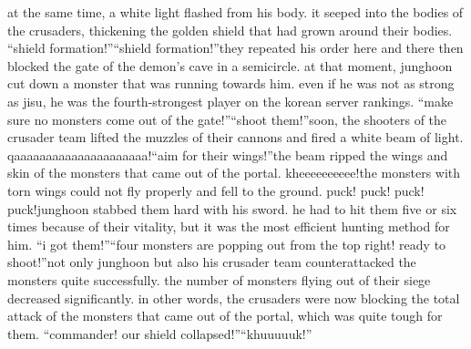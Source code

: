 at the same time, a white light flashed from his body.
 it seeped into the bodies of the crusaders, thickening the golden shield that had grown around their bodies.
“shield formation!”“shield formation!”they repeated his order here and there then blocked the gate of the demon’s cave in a semicircle.
at that moment, junghoon cut down a monster that was running towards him.
 even if he was not as strong as jisu, he was the fourth-strongest player on the korean server rankings.
“make sure no monsters come out of the gate!”“shoot them!”soon, the shooters of the crusader team lifted the muzzles of their cannons and fired a white beam of light.
qaaaaaaaaaaaaaaaaaaaaa!“aim for their wings!”the beam ripped the wings and skin of the monsters that came out of the portal.
kheeeeeeeeee!the monsters with torn wings could not fly properly and fell to the ground.
puck! puck! puck! puck!junghoon stabbed them hard with his sword.
 he had to hit them five or six times because of their vitality, but it was the most efficient hunting method for him.
“i got them!”“four monsters are popping out from the top right! ready to shoot!”not only junghoon but also his crusader team counterattacked the monsters quite successfully.
 the number of monsters flying out of their siege decreased significantly.
in other words, the crusaders were now blocking the total attack of the monsters that came out of the portal, which was quite tough for them.
“commander! our shield collapsed!”“khuuuuuk!”

 